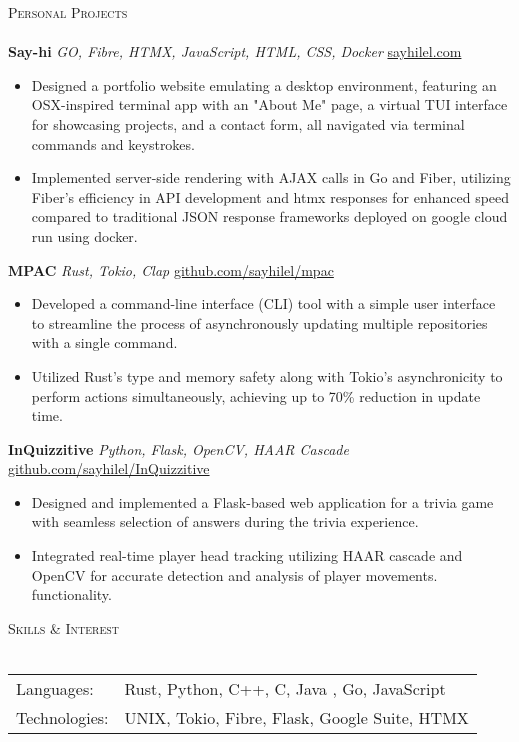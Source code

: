\documentclass[a4paper]{article}
\newcommand{\lineunder} {
    \vspace*{-8pt} \\
    \hspace*{-18pt} \hrulefill \\
}
\newcommand{\header} [1] {
    {\hspace*{-18pt}\vspace*{6pt} \textsc{#1}}
    \vspace*{-6pt} \lineunder
}
\begin{document}
\header{Personal Projects}
{\textbf{Say-hi}} {\sl GO, Fibre, HTMX, JavaScript, HTML, CSS, Docker} \hfill \href{https://sayhilel.com/}{sayhilel.com}
\begin{itemize} [label=\tiny$\bullet$]\itemsep 0.005pt
	\item Designed a portfolio website emulating a desktop environment, featuring an OSX-inspired terminal app with an "About Me" page, a virtual TUI interface for showcasing projects, and a contact form, all navigated via terminal commands and keystrokes.
	\item Implemented server-side rendering with AJAX calls in Go and Fiber, utilizing Fiber's efficiency in API development and htmx responses for enhanced speed compared to traditional JSON response frameworks deployed on google cloud run using docker.
\end{itemize}
\vspace*{1mm}
\textbf{MPAC} \textsl{Rust, Tokio, Clap} \hfill \href{https://github.com/sayhilel/mpac}{github.com/sayhilel/mpac}
\begin{itemize} [label=\tiny$\bullet$]\itemsep 0.005pt
  \item Developed a command-line interface (CLI) tool with a simple user interface to streamline the process of asynchronously updating multiple repositories with a single command.
  \item Utilized Rust's type and memory safety along with Tokio's asynchronicity to perform actions simultaneously, achieving up to 70\% reduction in update time.
\end{itemize}
\vspace*{1mm}
{\textbf{InQuizzitive}} {\sl Python, Flask, OpenCV, HAAR Cascade} \hfill \href{https://github.com/sayhilel/InQuizzitive}{github.com/sayhilel/InQuizzitive}
\begin{itemize}[label=\tiny$\bullet$]\itemsep 0.005pt
	\item Designed and implemented a Flask-based web 	application for a trivia game with seamless selection of answers during the trivia experience.
    \item Integrated real-time player head tracking utilizing HAAR cascade and OpenCV for accurate detection and analysis of player movements. functionality.
\end{itemize}
\vspace*{1mm}


\header{Skills \& Interest}
\begin{tabular}{ l l }
	Languages:    & Rust, Python, C++, C, Java , Go, JavaScript        \\
	Technologies: & UNIX, Tokio, Fibre, Flask, Google Suite, HTMX    \\
\end{tabular}
\vspace{2mm}
\end{document}
